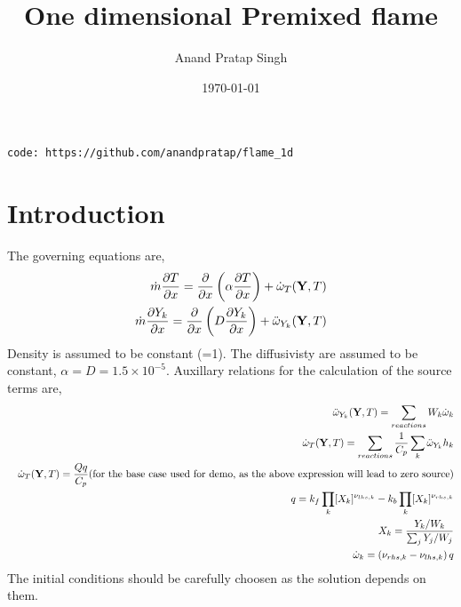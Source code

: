 \documentclass[%
notitlepage,
]{revtex4-1}
\newcommand{\pd}[2]{\frac{\partial #1}{\partial #2}}
\newcommand{\mat}[1]{{\ensuremath{\bf{ #1}}}}
\begin{document}
\preprint{}

\title[]{One dimensional Premixed flame }%

\author{Anand Pratap Singh}
%

\date{\today}%

\begin{abstract}

\end{abstract}

\vspace{1cm}
\texttt{code: https://github.com/anandpratap/flame\_1d}
\section{Introduction}
The governing equations are,
\begin{eqnarray}
  \dot{m}\pd{T}{x} = \pd{}{x}\left(\alpha\pd{T}{x}\right) + \dot{\omega}_T(\mat{Y}, T)\\
  \dot{m}\pd{Y_{k}}{x} = \pd{}{x}\left(D\pd{Y_{k}}{x}\right) + \ddot{\omega}_{Y_k}(\mat{Y}, T)\\
\end{eqnarray}
Density is assumed to be constant (=1). The diffusivisty are assumed to be constant, $\alpha = D = 1.5\times 10^{-5}$. Auxillary relations for the calculation of the source terms are,
\begin{eqnarray}
&&  \ddot{\omega}_{Y_k}(\mat{Y}, T) = \sum_{reactions}W_{k}\dot{\omega}_k\\ 
&&  \dot{\omega}_T(\mat{Y}, T) = \sum_{reactions}\frac{1}{C_p}\sum_{k}\ddot{\omega}_{Y_k}h_k\\
&&  \dot{\omega}_T(\mat{Y}, T) = \frac{Q q}{C_p} \text{(for the base case used for demo, as the above expression will lead to zero source)}\\
&&  q = k_f\prod_k [X_k]^{\nu_{lhs,k}} - k_b\prod_k [X_k]^{\nu_{rhs,k}}\\
&&  X_k = \frac{Y_k/W_k}{\sum_j Y_j/W_j}\\
&&  \dot{\omega}_{k} = \left(\nu_{rhs,k} - \nu_{lhs,k}\right)q
\end{eqnarray}
The initial conditions should be carefully choosen as the solution depends on them.
\end{document}
